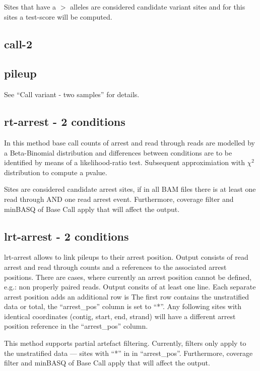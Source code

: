 \documentclass[10pt,a4paper]{article}
\begin{document}
Sites that have a $>$ alleles are considered candidate variant sites and for this sites a test-score will be computed.
\subsection{call-2}
\subsection{pileup}
See ``Call variant - two samples'' for details.
\subsection{rt-arrest - 2 conditions}
In this method base call counts of arrest and read through reads are modelled by a Beta-Binomial distribution and 
differences between conditions are to be identified by means of a likelihood-ratio test. Subsequent approximiation 
with $\chi^2$ distribution to compute a pvalue.

Sites are considered candidate arrest sites, if in all BAM files there is at least one read through AND one  
read arrest event. Furthermore, coverage filter and minBASQ of Base Call apply that will affect the output. 
\subsection{lrt-arrest - 2 conditions}
lrt-arrest allows to link pileups to their arrest position. Output consists of read arrest and read through counts and 
a references to the associated arrest positions. There are cases, where currently an arrest position cannot be defined, 
e.g.: non properly paired reads.
Output consits of at least one line. Each separate arrest position adds an additional row is 
The first row contains the unstratified data or total, the ``arrest\_pos'' column is set to ``*''.
Any following sites with identical coordinates (contig, start, end, strand) will have a different 
arrest position reference in the ``arrest\_pos'' column. 

This method supports partial artefact filtering. Currently, filters only apply to the unstratified data --- 
sites with ``*'' in in ``arrest\_pos''. Furthermore, coverage filter and minBASQ of Base Call apply 
that will affect the output.
\end{document}
